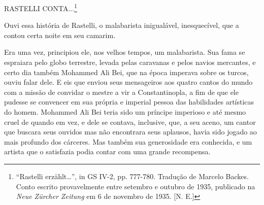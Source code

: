 RASTELLI CONTA...\footnote{``Rastelli erzählt\ldots{}'', in GS IV-2, pp.
  777-780. Tradução de Marcelo Backes. Conto escrito provavelmente entre
  setembro e outubro de 1935, publicado na \emph{Neue Zürcher Zeitung}
  em 6 de novembro de 1935. {[}N. E.{]}}

Ouvi essa história de Rastelli, o malabarista inigualável, inesquecível,
que a contou certa noite em seu camarim.

Era uma vez, principiou ele, nos velhos tempos, um malabarista. Sua fama
se espraiara pelo globo terrestre, levada pelas caravanas e pelos navios
mercantes, e certo dia também Mohammed Ali Bei, que na época imperava
sobre os turcos, ouviu falar dele. E eis que enviou seus mensageiros aos
quatro cantos do mundo com a missão de convidar o mestre a vir a
Constantinopla, a fim de que ele pudesse se convencer em sua própria e
imperial pessoa das habilidades artísticas do homem. Mohammed Ali Bei
teria sido um príncipe imperioso e até mesmo cruel de quando em vez, e
dele se contava, inclusive, que, a seu aceno, um cantor que buscara seus
ouvidos mas não encontrara seus aplausos, havia sido jogado ao mais
profundo dos cárceres. Mas também sua generosidade era conhecida, e um
artista que o satisfazia podia contar com uma grande recompensa.

